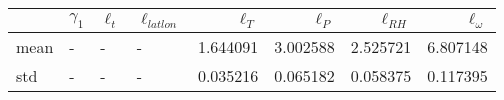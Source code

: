 \begin{tabular}{llllrrrr}
\toprule
{} & $\gamma_1$ & $\ell_t$ & $\ell_{latlon}$ &  $\ell_T$ &  $\ell_P$ &  $\ell_{RH}$ &  $\ell_\omega$ \\
\midrule
mean &          - &        - &               - &  1.644091 &  3.002588 &     2.525721 &       6.807148 \\
std  &          - &        - &               - &  0.035216 &  0.065182 &     0.058375 &       0.117395 \\
\bottomrule
\end{tabular}
